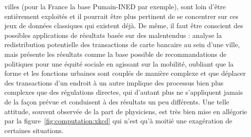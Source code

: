 {villes (pour la France la base Pumain-INED par exemple), sont loin d'être entièrement exploités et il pourrait être plus pertinent de se concentrer sur ces jeux de données classiques qui existent déjà. De même, il faut être conscient des possibles applications de résultats basée sur des malentendus : \cite{louail2016crowdsourcing} analyse la redistribution potentielle des transactions de carte bancaire au sein d'une ville, mais présente les résultats comme la base possible de recommandations de politiques pour une équité sociale en agissant sur la mobilité, oubliant que la forme et les fonctions urbaines sont couplés de manière complexe et que déplacer des transactions d'un endroit à un autre implique des processus bien plus complexes que des régulations directes, qui d'autant plus ne s'appliquent jamais de la façon prévue et conduisent à des résultats un peu différents. Une telle attitude, souvent observée de la part de physiciens, est très bien mise en allégorie par la figure~\ref{fig:computation:xkcd} qui n'est qu'à moitié une exagération de certaines situations.
}




